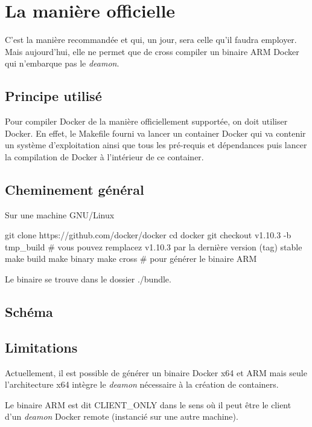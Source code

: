 \documentclass[11pt,a4paper,oneside]{report}
\begin{document}
\section{La manière officielle}

C'est la manière recommandée et qui, un jour, sera celle qu'il faudra
employer. Mais aujourd'hui, elle ne permet que de cross compiler un
binaire ARM Docker qui n'embarque pas le \emph{deamon}.

\subsection{Principe utilisé}

Pour compiler Docker de la manière officiellement supportée, on doit utiliser Docker. En effet, le Makefile fourni va lancer un container Docker qui va contenir un système d'exploitation ainsi que tous les pré-requis et dépendances puis lancer la compilation de Docker à l'intérieur de ce container.

\subsection{Cheminement général}

Sur une machine GNU/Linux

\begin{bashcode}
git clone https://github.com/docker/docker
cd docker
git checkout v1.10.3 -b tmp_build # vous pouvez remplacez v1.10.3 par la dernière version (tag) stable
make build
make binary
make cross # pour générer le binaire ARM
\end{bashcode}

Le binaire se trouve dans le dossier ./bundle.

\subsection{Schéma}

\subsection{Limitations}

Actuellement, il est possible de générer un binaire Docker x64 et ARM mais seule l'architecture x64 intègre le \emph{deamon} nécessaire à la création de containers.

Le binaire ARM est dit CLIENT\_ONLY dans le sens où il peut être le client d'un \emph{deamon} Docker remote (instancié sur une autre machine).
\end{document}
